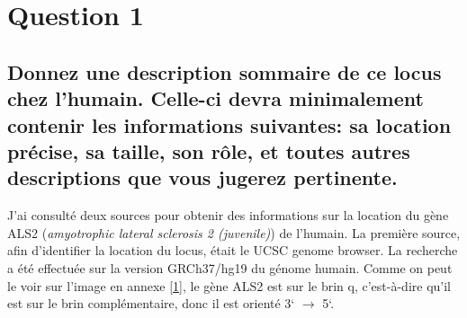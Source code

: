 \documentclass[10.8pt]{article} %
\begin{document}

\tableofcontents %

\newpage %

\section{Question 1} %

\subsection[Description du gène ALS2]{Donnez une description sommaire de ce locus chez l'humain. Celle-ci devra 
minimalement contenir les informations suivantes: sa location précise, sa taille, son rôle,
et toutes autres descriptions que vous jugerez pertinente.}

J'ai consulté deux sources pour obtenir des informations sur la location du gène ALS2 (\emph{amyotrophic lateral sclerosis 2 (juvenile)}) de l'humain. La première source,
afin d'identifier la location du locus, était le UCSC genome browser. La recherche a été effectuée sur la version GRCh37/hg19
du génome humain. Comme on peut le voir sur l'image en annexe \ref{1}, le gène ALS2 est sur le brin q, c'est-à-dire qu'il est sur le brin complémentaire, donc il est orienté 3` $\rightarrow$ 5`.
\end{document}
